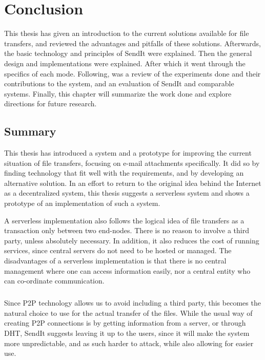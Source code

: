 %
\chapter{Conclusion} %
%
\label{Chapter8} %
This thesis has given an introduction to the current solutions available for file transfers, and reviewed the advantages and pitfalls of these solutions. Afterwards, the basic technology and principles of SendIt were explained. Then the general design and implementations were explained. After which it went through the specifics of each mode. Following, was a review of the experiments done and their contributions to the system, and an evaluation of SendIt and comparable systems. Finally, this chapter will summarize the work done and explore directions for future research.
%
\section{Summary}
%
This thesis has introduced a system and a prototype for improving the current situation of file transfers, focusing on e-mail attachments specifically. It did so by finding technology that fit well with the requirements, and by developing an alternative solution. In an effort to return to the original idea behind the Internet as a decentralized system, this thesis suggests a serverless system and shows a prototype of an implementation of such a system.

A serverless implementation also follows the logical idea of file transfers as a transaction only between two end-nodes. There is no reason to involve a third party, unless absolutely necessary. In addition, it also reduces the cost of running services, since central servers do not need to be hosted or managed. The disadvantages of a serverless implementation is that there is no central management where one can access information easily, nor a central entity who can co-ordinate communication.
%
\paragraph{}
%
Since P2P technology allows us to avoid including a third party, this becomes the natural choice to use for the actual transfer of the files. While the usual way of creating P2P connections is by getting information from a server, or through DHT, SendIt suggests leaving it up to the users, since it will make the system more unpredictable, and as such harder to attack, while also allowing for easier use.

